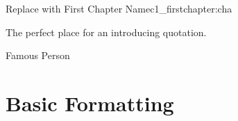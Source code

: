 
\begin{chapterpage}{Replace with First Chapter Name}{c1_firstchapter:cha}

\begin{myquotation} The perfect place for an introducing quotation.\par\vspace*{15mm}
\mbox{}\hfill \emdash{}Famous Person
\par\end{myquotation}

\end{chapterpage}



\section{Basic Formatting}\label{c1_basicformatting:sec}

